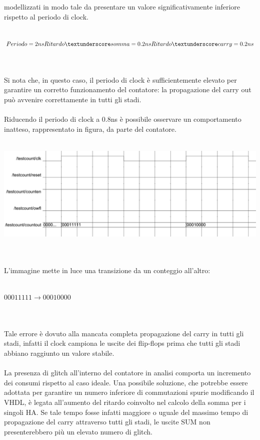 \documentclass[11pt,  english, makeidx, a4paper, titlepage, oneside]{book}
\begin{document}
modellizzati in modo tale da presentare un valore significativamente
inferiore rispetto al periodo di clock.
\\\\
\centerline{$Periodo = 2ns \\
            Ritardo\textunderscore somma = 0.2ns \\
            Ritardo\textunderscore carry = 0.2ns $}
\\\\
Si nota che, in questo caso, il periodo di clock è 
sufficientemente elevato per garantire un corretto funzionamento 
del contatore: la propagazione del carry out può avvenire correttamente
in tutti gli stadi.
\\\\
Riducendo il periodo di clock a 0.8ns è possibile osservare un
comportamento inatteso, rappresentato in figura, da parte del contatore.
\\\\
\centerline{\includegraphics[width=15cm]{./img/Lab_1/Es_5/Clk_corto.png}}
\\\\
L'immagine mette in luce una transizione da un conteggio all'altro:
\\\\
\centerline{$00011111 \rightarrow 00010000$}
\\\\
Tale errore è dovuto alla mancata completa propagazione del carry in tutti
gli stadi, infatti il clock campiona le uscite dei flip-flops prima che tutti
gli stadi abbiano raggiunto un valore stabile. 
\\\\
La presenza di glitch all'interno del contatore in analisi comporta
un incremento dei consumi rispetto al caso ideale. Una possibile soluzione, che potrebbe
essere adottata per garantire un numero inferiore di commutazioni spurie modificando il VHDL, è legata
all'aumento del ritardo coinvolto nel calcolo della somma per i singoli HA. 
Se tale tempo fosse infatti maggiore o uguale del massimo tempo di propagazione 
del carry attraverso tutti gli stadi, le uscite SUM non presenterebbero più un elevato numero di glitch.
\newpage
\end{document}

